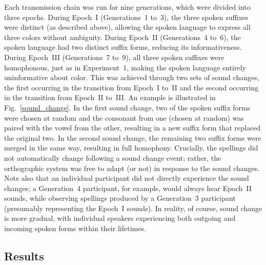 \documentclass[doc,biblatex]{apa7}
\begin{document}
Each transmission chain was run for nine generations, which were divided into three epochs. During Epoch~I (Generations~1 to~3), the three spoken suffixes were distinct (as described above), allowing the spoken language to express all three colors without ambiguity. During Epoch~II (Generations~4 to~6), the spoken language had two distinct suffix forms, reducing its informativeness. During Epoch~III (Generations~7 to~9), all three spoken suffixes were homophonous, just as in Experiment~1, making the spoken language entirely uninformative about color. This was achieved through two sets of sound changes, the first occurring in the transition from Epoch~I to~II and the second occurring in the transition from Epoch~II to~III. An example is illustrated in Fig.~\ref{sound_change}. In the first sound change, two of the spoken suffix forms were chosen at random and the consonant from one (chosen at random) was paired with the vowel from the other, resulting in a new suffix form that replaced the original two. In the second sound change, the remaining two suffix forms were merged in the same way, resulting in full homophony. Crucially, the spellings did not automatically change following a sound change event; rather, the orthographic system was free to adapt (or not) in response to the sound changes. Note also that an individual participant did not directly experience the sound changes; a Generation~4 participant, for example, would always hear Epoch~II sounds, while observing spellings produced by a Generation~3 participant (presumably representing the Epoch~I sounds). In reality, of course, sound change is more gradual, with individual speakers experiencing both outgoing and incoming spoken forms within their lifetimes.

\subsection{Results}
\end{document}

